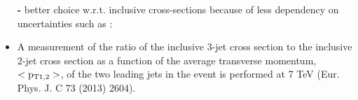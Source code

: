 \documentclass{beamer}
\begin{document}
\begin{frame}
\begin{itemize}
{{\bf -} better choice w.r.t. inclusive cross-sections because of less dependency on uncertainties such as : \\}
\ball
\vspace{0.5mm}
\item {\scriptsize A measurement of the ratio of the inclusive 3-jet cross section to the inclusive 2-jet cross section as a function of the average transverse momentum, $\rm{<p_{T1,2}>}$, of the two leading jets in the event is performed at 7 TeV (\textcolor{red!80!black}{Eur. Phys. J. C 73 (2013) 2604}).\\}
\end{itemize}
\end{frame}

\begin{frame}
\begin{center}
\vspace{13mm}
\textbf{\Large{}}
\end{center}
\end{frame}
\end{document}
